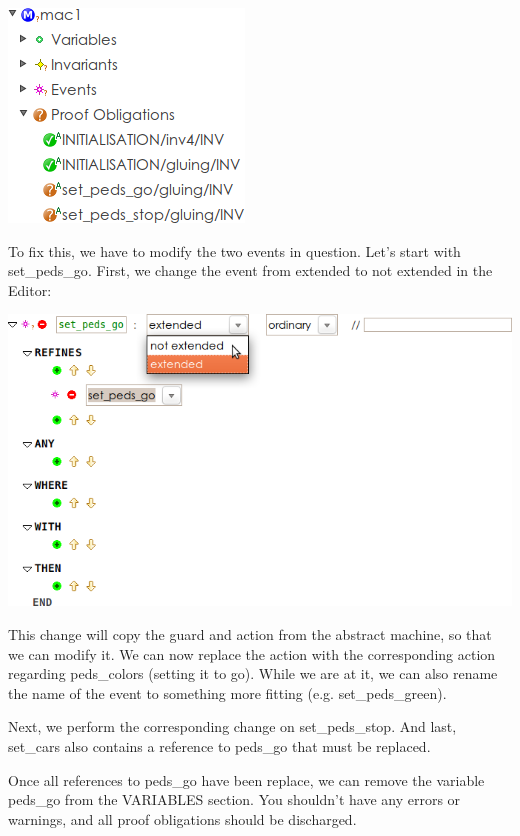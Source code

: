 \begin{center}
	\includegraphics{img/tutorial/undischarged1.png}
	\label{fig:undischarged}
\end{center}

To fix this, we have to modify the two events in question.  Let's start with \textsf{set\_peds\_go}.  First, we change the event from extended to not extended in the Editor:

\begin{center}
	\includegraphics{img/tutorial/event-refinement.png}
	\label{fig:event-refinement}
\end{center}

This change will copy the guard and action from the abstract machine, so that we can modify it.  We can now replace the action with the corresponding action regarding \textsf{peds\_colors} (setting it to \textsf{go}).  While we are at it, we can also rename the name of the event to something more fitting (e.g. \textsf{set\_peds\_green}).

Next, we perform the corresponding change on \textsf{set\_peds\_stop}.  And last, \textsf{set\_cars} also contains a reference to \textsf{peds\_go} that must be replaced.

Once all references to \textsf{peds\_go} have been replace, we can remove the variable \textsf{peds\_go} from the \textsf{VARIABLES} section.  You shouldn't have any errors or warnings, and all proof obligations should be discharged.

